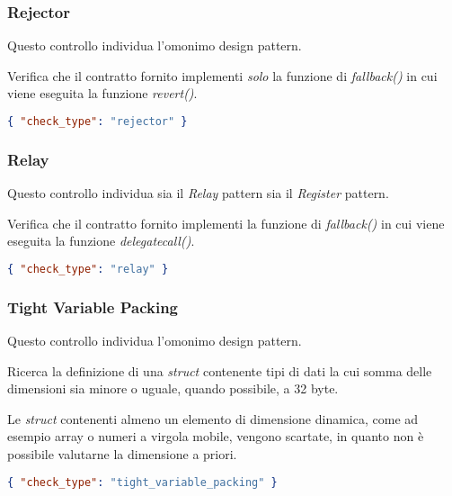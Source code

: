 \subsubsection{Rejector}
Questo controllo individua l'omonimo design pattern.\par Verifica che il contratto fornito implementi \textit{solo} la funzione di \textit{fallback()} in cui viene eseguita la funzione \textit{revert()}.
{\begin{lstlisting}[language=json, caption={Controllo Rejector}]
{ "check_type": "rejector" }\end{lstlisting}}
	
\subsubsection{Relay}
Questo controllo individua sia il \textit{Relay} pattern sia il \textit{Register} pattern.\par Verifica che il contratto fornito implementi la funzione di \textit{fallback()} in cui viene eseguita la funzione \textit{delegatecall()}.
{\begin{lstlisting}[language=json, caption={Controllo Relay}]
{ "check_type": "relay" }\end{lstlisting}}
	
\subsubsection{Tight Variable Packing}
Questo controllo individua l'omonimo design pattern.\par Ricerca la definizione di una \textit{struct} contenente tipi di dati la cui somma delle dimensioni sia minore o uguale, quando possibile, a 32 byte.\par
Le \textit{struct} contenenti almeno un elemento di dimensione dinamica, come ad esempio array o numeri a virgola mobile, vengono scartate, in quanto non è possibile valutarne la dimensione a priori.
{\begin{lstlisting}[language=json, caption={Controllo Tight Variable Packing}]
{ "check_type": "tight_variable_packing" }\end{lstlisting}}


